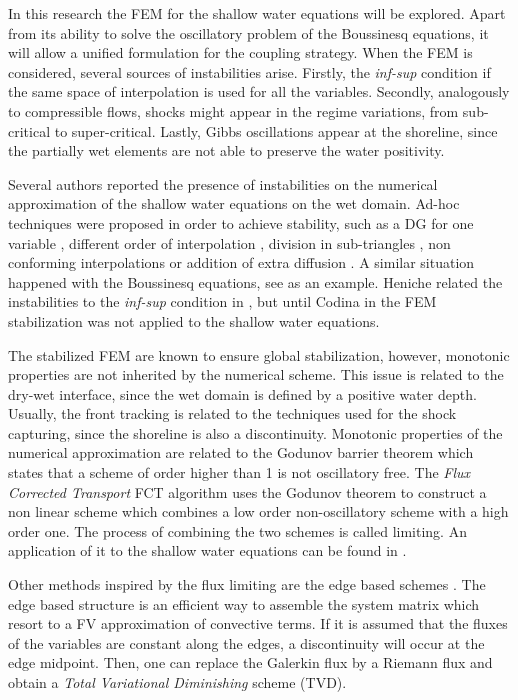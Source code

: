 In this research the FEM for the shallow water equations will be explored. Apart from its ability to solve the oscillatory problem of the Boussinesq equations, it will allow a unified formulation for the coupling strategy. When the FEM is considered, several sources of instabilities arise. Firstly, the \emph{inf-sup} condition if the same space of interpolation is used for all the variables. Secondly, analogously to compressible flows, shocks might appear in the regime variations, from sub-critical to super-critical. Lastly, Gibbs oscillations appear at the shoreline, since the partially wet elements are not able to preserve the water positivity.

Several authors reported the presence of instabilities on the numerical approximation of the shallow water equations on the wet domain. Ad-hoc techniques were proposed in order to achieve stability, such as a DG for one variable \cite{gourgue2009}, different order of interpolation \cite{leclerc1990}, division in sub-triangles \cite{heniche2000}, non conforming interpolations \cite{hanert2005} or addition of extra diffusion \cite{defina2000}. A similar situation happened with the Boussinesq equations, see \cite{walkley2002,woo2004a} as an example. Heniche related the instabilities to the \emph{inf-sup} condition in \cite{heniche2000}, but until Codina in \cite{codina2008} the FEM stabilization was not applied to the shallow water equations.

The stabilized FEM are known to ensure global stabilization, however, monotonic properties are not inherited by the numerical scheme. This issue is related to the dry-wet interface, since the wet domain is defined by a positive water depth. Usually, the front tracking is related to the techniques used for the shock capturing, since the shoreline is also a discontinuity.
Monotonic properties of the numerical approximation are related to the Godunov barrier theorem \cite{godunov1959} which states that a scheme of order higher than 1 is not oscillatory free. The \emph{Flux Corrected Transport} FCT algorithm \cite{lohner2008ch9} uses the Godunov theorem to construct a non linear scheme which combines a low order non-oscillatory scheme with a high order one. The process of combining the two schemes is called limiting. An application of it to the shallow water equations can be found in \cite{ortiz2012}.

Other methods inspired by the flux limiting are the edge based schemes \cite{lohner2008ch10}. The edge based structure is an efficient way to assemble the system matrix which resort to a FV approximation of convective terms. If it is assumed that the fluxes of the variables are constant along the edges, a discontinuity will occur at the edge midpoint. Then, one can replace the Galerkin flux by a Riemann flux and obtain a \emph{Total Variational Diminishing} scheme (TVD).

